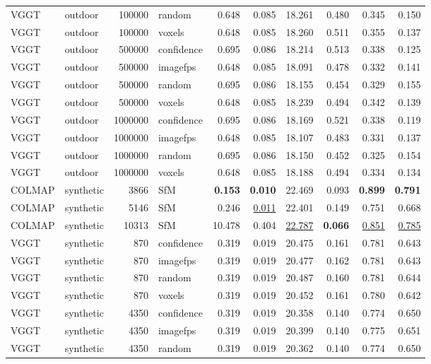 \begin{table}[H]
\begin{tabular}{llrlrrrrrr}
VGGT & outdoor & 100000 & random & 0.648 & 0.085 & 18.261 & 0.480 & 0.345 & 0.150 \\
VGGT & outdoor & 100000 & voxels & 0.648 & 0.085 & 18.260 & 0.511 & 0.355 & 0.137 \\
VGGT & outdoor & 500000 & confidence & 0.695 & 0.086 & 18.214 & 0.513 & 0.338 & 0.125 \\
VGGT & outdoor & 500000 & imagefps & 0.648 & 0.085 & 18.091 & 0.478 & 0.332 & 0.141 \\
VGGT & outdoor & 500000 & random & 0.695 & 0.086 & 18.155 & 0.454 & 0.329 & 0.155 \\
VGGT & outdoor & 500000 & voxels & 0.648 & 0.085 & 18.239 & 0.494 & 0.342 & 0.139 \\
VGGT & outdoor & 1000000 & confidence & 0.695 & 0.086 & 18.169 & 0.521 & 0.338 & 0.119 \\
VGGT & outdoor & 1000000 & imagefps & 0.648 & 0.085 & 18.107 & 0.483 & 0.331 & 0.137 \\
VGGT & outdoor & 1000000 & random & 0.695 & 0.086 & 18.150 & 0.452 & 0.325 & 0.154 \\
VGGT & outdoor & 1000000 & voxels & 0.648 & 0.085 & 18.188 & 0.494 & 0.334 & 0.134 \\
\midrule
COLMAP & synthetic & 3866 & SfM & \textbf{0.153} & \textbf{0.010} & 22.469 & 0.093 & \textbf{0.899} & \textbf{0.791} \\
COLMAP & synthetic & 5146 & SfM & 0.246 & \underline{0.011} & 22.401 & 0.149 & 0.751 & 0.668 \\
COLMAP & synthetic & 10313 & SfM & 10.478 & 0.404 & \underline{22.787} & \textbf{0.066} & \underline{0.851} & \underline{0.785} \\
VGGT & synthetic & 870 & confidence & 0.319 & 0.019 & 20.475 & 0.161 & 0.781 & 0.643 \\
VGGT & synthetic & 870 & imagefps & 0.319 & 0.019 & 20.477 & 0.162 & 0.781 & 0.643 \\
VGGT & synthetic & 870 & random & 0.319 & 0.019 & 20.487 & 0.160 & 0.781 & 0.644 \\
VGGT & synthetic & 870 & voxels & 0.319 & 0.019 & 20.452 & 0.161 & 0.780 & 0.642 \\
VGGT & synthetic & 4350 & confidence & 0.319 & 0.019 & 20.358 & 0.140 & 0.774 & 0.650 \\
VGGT & synthetic & 4350 & imagefps & 0.319 & 0.019 & 20.399 & 0.140 & 0.775 & 0.651 \\
VGGT & synthetic & 4350 & random & 0.319 & 0.019 & 20.362 & 0.140 & 0.774 & 0.650 \\

\end{tabular}
\end{table}
